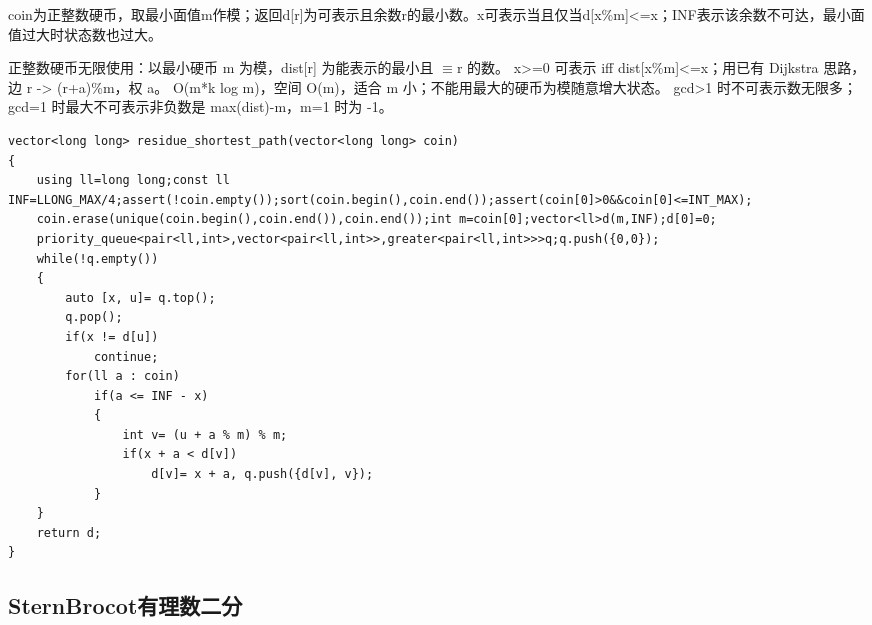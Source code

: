 \documentclass[UTF8,fontset=fandol,a4paper,twoside]{ctexart}
\newcommand{\note}[1]{{\fontsize{10}{12}\selectfont #1\par}}
\begin{document}
\begin{multicols}{2}
\note{coin为正整数硬币，取最小面值m作模；返回d[\allowbreak{}r]\allowbreak{}为可表示且余数r的最小数。x可表示当且仅当d[\allowbreak{}x\%m]\allowbreak{}<\allowbreak{}=\allowbreak{}x；INF表示该余数不可达，最小面值过大时状态数也过大。}
\note{正整数硬币无限使用：以最小硬币 m 为模，dist[\allowbreak{}r]\allowbreak{} 为能表示的最小且 \ensuremath{\equiv}r 的数。 x>\allowbreak{}=\allowbreak{}0 可表示 iff dist[\allowbreak{}x\%m]\allowbreak{}<\allowbreak{}=\allowbreak{}x；用已有 Dijkstra 思路，边 r -\allowbreak{}>\allowbreak{} (\allowbreak{}r+\allowbreak{}a)\allowbreak{}\%m，权 a。 O(\allowbreak{}m*k log m)\allowbreak{}，空间 O(\allowbreak{}m)\allowbreak{}，适合 m 小；不能用最大的硬币为模随意增大状态。 gcd>\allowbreak{}1 时不可表示数无限多；gcd=\allowbreak{}1 时最大不可表示非负数是 max(\allowbreak{}dist)\allowbreak{}-\allowbreak{}m，m=\allowbreak{}1 时为 -\allowbreak{}1。}
\begin{lstlisting}
vector<long long> residue_shortest_path(vector<long long> coin)
{
    using ll=long long;const ll INF=LLONG_MAX/4;assert(!coin.empty());sort(coin.begin(),coin.end());assert(coin[0]>0&&coin[0]<=INT_MAX);
    coin.erase(unique(coin.begin(),coin.end()),coin.end());int m=coin[0];vector<ll>d(m,INF);d[0]=0;
    priority_queue<pair<ll,int>,vector<pair<ll,int>>,greater<pair<ll,int>>>q;q.push({0,0});
    while(!q.empty())
    {
        auto [x, u]= q.top();
        q.pop();
        if(x != d[u])
            continue;
        for(ll a : coin)
            if(a <= INF - x)
            {
                int v= (u + a % m) % m;
                if(x + a < d[v])
                    d[v]= x + a, q.push({d[v], v});
            }
    }
    return d;
}
\end{lstlisting}
\subsection{SternBrocot有理数二分}


\end{multicols}
\end{document}

